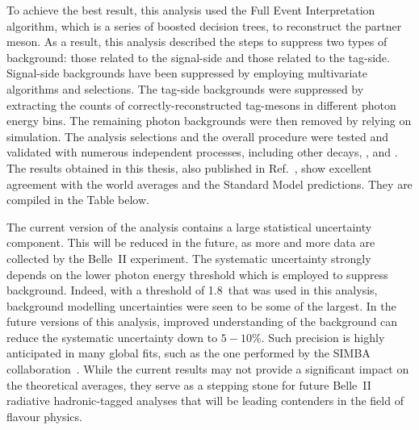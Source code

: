 To achieve the best result, this \BtoXsgamma analysis used the Full Event Interpretation algorithm, which is a series of boosted decision trees, to reconstruct the partner \B meson.
As a result, this analysis described the steps to suppress two types of background: those related to the signal-side and those related to the tag-side.
Signal-side backgrounds have been suppressed by employing multivariate algorithms and selections.
The tag-side backgrounds were suppressed by extracting the counts of correctly-reconstructed tag-\B mesons in different photon energy bins.
The remaining photon backgrounds were then removed by relying on simulation.
The analysis selections and the overall procedure were tested and validated with numerous independent processes, including other \B decays, \mbox{\epem\ra\qqbar}, and \mbox{\epem\ra\mumu}.
The results obtained in this thesis, also published in Ref.~\cite{Belle-II:2022hys}, show excellent agreement with the world averages and the Standard Model predictions.
They are compiled in the Table below.
\begin{table}[hbtp!]
\end{table}

The current version of the analysis contains a large statistical uncertainty component. 
This will be reduced in the future, as more and more data are collected by the Belle~II experiment.
The systematic uncertainty strongly depends on the lower photon energy threshold which is employed to suppress background.
Indeed, with a threshold of 1.8~\gev that was used in this analysis, background modelling uncertainties were seen to be some of the largest.
In the future versions of this analysis, improved understanding of the background can reduce the systematic uncertainty down to $5-10\%$.
Such precision is highly anticipated in many global fits, such as the one performed by the SIMBA collaboration~\cite{Bernlochner:2020jlt}.
While the current results may not provide a significant impact on the theoretical averages, they serve as a stepping stone for future Belle~II radiative hadronic-tagged analyses that will be leading contenders in the field of flavour physics.






